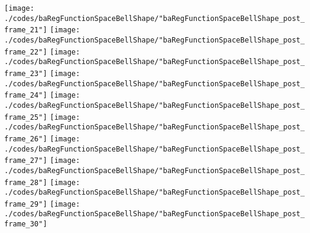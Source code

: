 \begin{frame}{\insertsection}
\begin{center}
{\begin{animateinline}{20}
				 \texttt{[image: ./codes/baRegFunctionSpaceBellShape/"baRegFunctionSpaceBellShape\_post\_frame\_21"]}\newframe
				 \texttt{[image: ./codes/baRegFunctionSpaceBellShape/"baRegFunctionSpaceBellShape\_post\_frame\_22"]}\newframe
				 \texttt{[image: ./codes/baRegFunctionSpaceBellShape/"baRegFunctionSpaceBellShape\_post\_frame\_23"]}\newframe
				 \texttt{[image: ./codes/baRegFunctionSpaceBellShape/"baRegFunctionSpaceBellShape\_post\_frame\_24"]}\newframe
				 \texttt{[image: ./codes/baRegFunctionSpaceBellShape/"baRegFunctionSpaceBellShape\_post\_frame\_25"]}\newframe
				 \texttt{[image: ./codes/baRegFunctionSpaceBellShape/"baRegFunctionSpaceBellShape\_post\_frame\_26"]}\newframe
				 \texttt{[image: ./codes/baRegFunctionSpaceBellShape/"baRegFunctionSpaceBellShape\_post\_frame\_27"]}\newframe
				 \texttt{[image: ./codes/baRegFunctionSpaceBellShape/"baRegFunctionSpaceBellShape\_post\_frame\_28"]}\newframe
				 \texttt{[image: ./codes/baRegFunctionSpaceBellShape/"baRegFunctionSpaceBellShape\_post\_frame\_29"]}\newframe
				 \texttt{[image: ./codes/baRegFunctionSpaceBellShape/"baRegFunctionSpaceBellShape\_post\_frame\_30"]}
			 \end{animateinline}
			}
	\end{center}
    
\end{frame}


